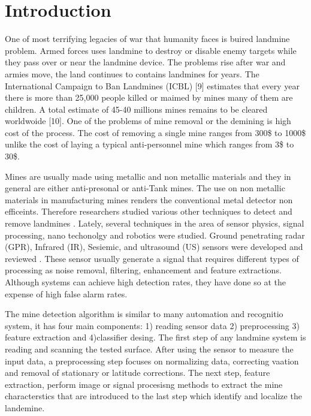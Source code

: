 \documentclass[conference]{IEEEtran}
\begin{document}
\section{Introduction}
\label{sec:introduction}
One of most terrifying legacies of war that humanity faces is buired landmine
problem. Armed forces uses landmine  to destroy or disable enemy targets while
they pass over or near the landmine device. The problems rise after war and
armies move, the land continues to contains landmines for years. The
International Campaign to Ban Landmines (ICBL) [9] estimates that every year
there is more than 25,000 people killed or maimed by mines many of them are
children. A total estimate of 45-40 millions mines remains to be cleared
worldwoide [10]. One of the problems of mine removal or the demining is
high cost of the process. The cost of removing a single mine ranges from  300\$ to 1000\$
unlike the cost of laying a typical anti-personnel mine which ranges from 3\$ to
30\$.

Mines are usually made using metallic and non metallic materials and they in
general are either anti-presonal or anti-Tank mines. The use on non metallic
materials in manufacturing mines renders the conventional metal detector non
efficeints. Therefore researchers studied various other techniques to detect and remove landmines  \cite{Ho2002,Tan2005,Potin2006}.  Lately, several techniques in the area of sensor physics, signal processing, nano techonolgy and robotics were studied.  Ground penetrating radar (GPR), Infrared (IR), Sesiemic,  and ultrasound (US) sensors were developed and reviewed \cite{Scott2004,Ng2008}. These sensor usually generate a signal that requires different types of processing as noise removal, filtering, enhancement and feature extractions\cite{Ng2008,Potin2006}. Although systems can achieve high detection rates, they have done so at the expense of high false alarm rates.   %


The mine detection algorithm is similar to many automation and recognitio system, it has four main components: 1) reading sensor data 2) preprocessing 3) feature extraction and 4)classifier desing. The first step of any landmine system is reading and scanning the tested surface. After using the sensor to measure the input data, a preprocessing step focuses on normalizing data, correcting vaation and removal of stationary or latitude corrections. The next step, feature extraction, perform image or signal procesisng methods to extract the mine characterstics that are introduced to the last step which identify and localize the landemine.
\end{document}
